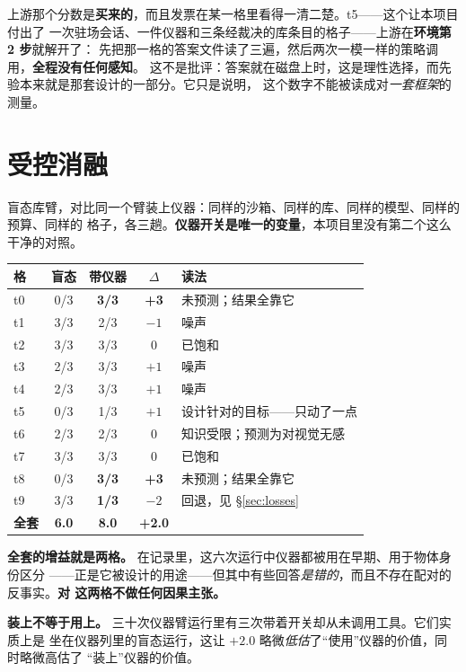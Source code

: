 \documentclass[11pt,a4paper,UTF8,fontset=macnew]{ctexrep}
\newcommand{\keyrule}[1]{\textbf{\textcolor{acc}{#1}}}
\begin{document}
\noindent
上游那个分数是\textbf{买来的}，而且发票在某一格里看得一清二楚。t5——这个让本项目付出了
一次驻场会话、一件仪器和三条经裁决的库条目的格子——上游在\textbf{环境第 2 步}就解开了：
先把那一格的答案文件读了三遍，然后两次一模一样的策略调用，\textbf{全程没有任何感知}。
这不是批评：答案就在磁盘上时，这是理性选择，而先验本来就是那套设计的一部分。它只是说明，
这个数字不能被读成对\emph{一套框架}的测量。

\section{受控消融}

盲态库臂，对比同一个臂装上仪器：同样的沙箱、同样的库、同样的模型、同样的预算、同样的
格子，各三趟。\textbf{仪器开关是唯一的变量}，本项目里没有第二个这么干净的对照。

\begin{table}[htbp]
\centering\small
\begin{tabular}{@{}l c c c l@{}}
\toprule
\textbf{格} & \textbf{盲态} & \textbf{带仪器} & \textbf{$\Delta$} & \textbf{读法} \\
\midrule
t0 & 0/3 & \textbf{3/3} & \textbf{+3} & 未预测；结果全靠它 \\
t1 & 3/3 & 2/3 & $-1$ & 噪声 \\
t2 & 3/3 & 3/3 & 0 & 已饱和 \\
t3 & 2/3 & 3/3 & $+1$ & 噪声 \\
t4 & 2/3 & 3/3 & $+1$ & 噪声 \\
t5 & 0/3 & 1/3 & $+1$ & 设计针对的目标——只动了一点 \\
t6 & 2/3 & 2/3 & 0 & 知识受限；预测为对视觉无感 \\
t7 & 3/3 & 3/3 & 0 & 已饱和 \\
t8 & 0/3 & \textbf{3/3} & \textbf{+3} & 未预测；结果全靠它 \\
t9 & 3/3 & \textbf{1/3} & \textbf{$-2$} & 回退，见 §\ref{sec:losses} \\
\midrule
\textbf{全套} & \textbf{6.0} & \textbf{8.0} & \textbf{+2.0} & \\
\bottomrule
\end{tabular}
\end{table}

\noindent
\textbf{全套的增益就是两格。} 在记录里，这六次运行中仪器都被用在早期、用于物体身份区分
——正是它被设计的用途——但其中有些回答\emph{是错的}，而且不存在配对的反事实。\textbf{对
这两格不做任何因果主张。}

\keyrule{装上不等于用上。} 三十次仪器臂运行里有三次带着开关却从未调用工具。它们实质上是
坐在仪器列里的盲态运行，这让 $+2.0$ 略微\emph{低估}了“使用”仪器的价值，同时略微高估了
“装上”仪器的价值。
\end{document}
